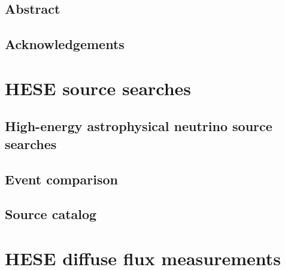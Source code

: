 \documentclass[oneside, letterpaper, 10pt, oldfontcommands]{memoir}
\begin{document}
\frontmatter

\thetitlepage
\cleardoublepage
\setcounter{page}{1}

\section{Abstract}
\uwabstract
\cleardoublepage

\section{Acknowledgements}


\clearpage
\tableofcontents\clearpage

\mainmatter














\clearpage
\newpage
\appendix

\begingroup
\graphicspath{{results/HESE_Final_Paper/}}
\chapter{HESE source searches}
\section{High-energy astrophysical neutrino source searches\label{sec:sources}}

\section{Event comparison\label{sec:comparison}}

\section{Source catalog\label{sec:source_catalog}}


\chapter{HESE diffuse flux measurements}
\end{document}
